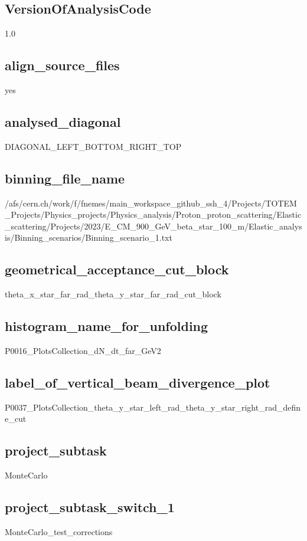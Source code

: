 \documentclass{article}
\begin{document}
\begin{landscape}
\subsection{VersionOfAnalysisCode}
1.0 \newline
\subsection{align\_source\_files}
yes \newline
\subsection{analysed\_diagonal}
DIAGONAL\_LEFT\_BOTTOM\_RIGHT\_TOP \newline
\subsection{binning\_file\_name}
/afs/cern.ch/work/f/fnemes/main\_workspace\_github\_ssh\_4/Projects/TOTEM\_Projects/Physics\_projects/Physics\_analysis/Proton\_proton\_scattering/Elastic\_scattering/Projects/2023/E\_CM\_900\_GeV\_beta\_star\_100\_m/Elastic\_analysis/Binning\_scenarios/Binning\_scenario\_1.txt \newline
\subsection{geometrical\_acceptance\_cut\_block}
theta\_x\_star\_far\_rad\_theta\_y\_star\_far\_rad\_cut\_block \newline
\subsection{histogram\_name\_for\_unfolding}
P0016\_PlotsCollection\_dN\_dt\_far\_GeV2 \newline
\subsection{label\_of\_vertical\_beam\_divergence\_plot}
P0037\_PlotsCollection\_theta\_y\_star\_left\_rad\_theta\_y\_star\_right\_rad\_define\_cut \newline
\subsection{project\_subtask}
MonteCarlo \newline
\subsection{project\_subtask\_switch\_1}
MonteCarlo\_test\_corrections \newline

\end{landscape}
\end{document}
